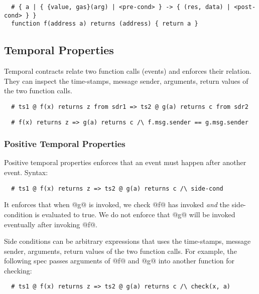\documentclass[acmsmall,review,anonymous]{acmart}\settopmatter{printfolios=true,printccs=false,printacmref=false}
\begin{document}
\begin{lstlisting}
  # { a | { {value, gas}(arg) | <pre-cond> } -> { (res, data) | <post-cond> } }
  function f(address a) returns (address) { return a }
\end{lstlisting}

\subsection{Temporal Properties}

Temporal contracts relate two function calls (events) and enforces their
relation.
They can inspect the time-stamps, message sender, arguments, return values
of the two function calls.

\begin{lstlisting}
  # ts1 @ f(x) returns z from sdr1 => ts2 @ g(a) returns c from sdr2
\end{lstlisting}
\begin{lstlisting}
  # f(x) returns z => g(a) returns c /\ f.msg.sender == g.msg.sender
\end{lstlisting}

\subsubsection{Positive Temporal Properties}

Positive temporal properties enforces that an event must happen
after another event. Syntax:
\begin{lstlisting}
  # ts1 @ f(x) returns z => ts2 @ g(a) returns c /\ side-cond
\end{lstlisting}
It enforces that when @g@ is invoked, we check @f@ has invoked \emph{and}
the side-condition is evaluated to true.
We do not enforce that @g@ will be invoked eventually after invoking @f@.

Side conditions can be arbitrary expressions that uses the time-stamps, message
sender, arguments, return values of the two function calls.
For example, the following spec passes arguments of @f@ and @g@ into
another function for checking:

\begin{lstlisting}
  # ts1 @ f(x) returns z => ts2 @ g(a) returns c /\ check(x, a)
\end{lstlisting}
\end{document}
